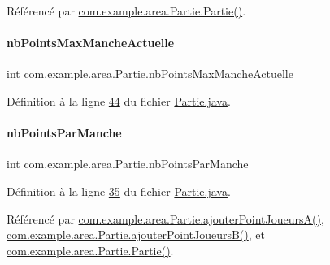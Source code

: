Référencé par \hyperlink{_partie_8java_source_l00046}{com.\+example.\+area.\+Partie.\+Partie()}.

\mbox{\label{classcom_1_1example_1_1area_1_1_partie_a4b5e5464eb3b37f7c78d4134bf29a7f8}} 
\paragraph{\texorpdfstring{nb\+Points\+Max\+Manche\+Actuelle}{nbPointsMaxMancheActuelle}}
{\footnotesize\ttfamily int com.\+example.\+area.\+Partie.\+nb\+Points\+Max\+Manche\+Actuelle\hspace{0.3cm}{\ttfamily [private]}}



Définition à la ligne \hyperlink{_partie_8java_source_l00044}{44} du fichier \hyperlink{_partie_8java_source}{Partie.\+java}.

\mbox{\label{classcom_1_1example_1_1area_1_1_partie_a23cd7e19042eece7057f810bba2f4f2c}} 
\paragraph{\texorpdfstring{nb\+Points\+Par\+Manche}{nbPointsParManche}}
{\footnotesize\ttfamily int com.\+example.\+area.\+Partie.\+nb\+Points\+Par\+Manche\hspace{0.3cm}{\ttfamily [private]}}



Définition à la ligne \hyperlink{_partie_8java_source_l00035}{35} du fichier \hyperlink{_partie_8java_source}{Partie.\+java}.



Référencé par \hyperlink{_partie_8java_source_l00128}{com.\+example.\+area.\+Partie.\+ajouter\+Point\+Joueurs\+A()}, \hyperlink{_partie_8java_source_l00147}{com.\+example.\+area.\+Partie.\+ajouter\+Point\+Joueurs\+B()}, et \hyperlink{_partie_8java_source_l00046}{com.\+example.\+area.\+Partie.\+Partie()}.

